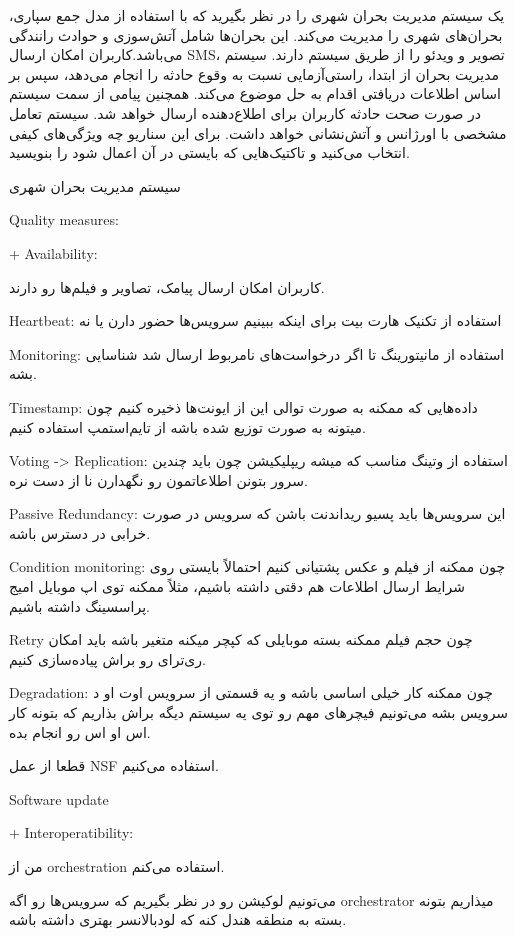 یک سیستم مدیریت بحران شهری را در نظر بگیرید که با استفاده از مدل جمع سپاری،
بحران‌های شهری را مدیریت می‌کند. این بحران‌ها شامل آتش‌سوزی و حوادث رانندگی
می‌باشد.کاربران امکان ارسال SMS، تصویر و ویدئو را از طریق سیستم دارند. سیستم
مدیریت بحران از ابتدا، راستی‌آزمایی نسبت به وقوع حادثه را انجام می‌دهد، سپس بر
اساس اطلاعات دریافتی اقدام به حل موضوع می‌کند. همچنین پیامی از سمت سیستم در صورت
صحت حادثه کاربران برای اطلاع‌دهنده ارسال خواهد شد. سیستم تعامل مشخصی با اورژانس
و آتش‌نشانی خواهد داشت.
 برای این سناریو چه ویژگی‌های کیفی انتخاب می‌کنید و
تاکتیک‌هایی که بایستی در آن اعمال شود را بنویسید.

سیستم مدیریت بحران شهری

Quality measures:

+ Availability:

کاربران امکان ارسال پیامک، تصاویر و فیلم‌ها رو دارند.

Heartbeat:
استفاده از تکنیک هارت بیت برای اینکه ببینیم سرویس‌ها حضور دارن یا نه

Monitoring:
استفاده از مانیتورینگ تا اگر درخواست‌های نامربوط ارسال شد شناسایی بشه.

Timestamp:
داده‌هایی که ممکنه به صورت توالی این از ایونت‌ها ذخیره کنیم چون میتونه به صورت
توزیع شده باشه از تایم‌استمپ استفاده کنیم.

Voting -> Replication:
استفاده از وتینگ مناسب که میشه ریپلیکیشن چون باید چندین سرور بتونن اطلاعاتمون رو
نگهدارن نا از دست نره.

Passive Redundancy:
این سرویس‌ها باید پسیو ریداندنت باشن که سرویس در صورت خرابی در دسترس باشه.

Condition monitoring:
چون ممکنه از فیلم و عکس پشتیانی کنیم احتمالاً بایستی روی شرایط ارسال اطلاعات هم
دقتی داشته باشیم، مثلاً ممکنه توی اپ موبایل امیج پراسسینگ داشته باشیم.

Retry
چون حجم فیلم ممکنه بسته موبایلی که کپچر میکنه متغیر باشه باید امکان ری‌ترای رو
براش پیاده‌سازی کنیم.

Degradation:
چون ممکنه کار خیلی اساسی باشه و یه قسمتی از سرویس اوت او د سرویس بشه می‌تونیم
فیچر‌های مهم رو توی یه سیستم دیگه براش بذاریم که بتونه کار اس او اس رو انجام
بده.

قطعا از عمل NSF استفاده می‌کنیم.

Software update

+ Interoperatibility:

من از orchestration استفاده می‌کنم.

می‌تونیم لوکیشن رو در نظر بگیریم که سرویس‌ها رو اگه orchestrator میذاریم بتونه
بسته به منطقه هندل کنه که لود‌بالانسر بهتری داشته باشه.